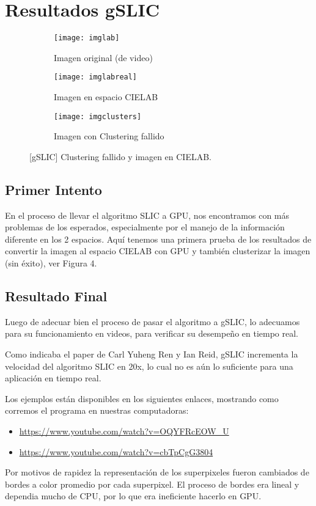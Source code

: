 \documentclass[11pt, oneside]{article}   	%
\begin{document}
\section{Resultados gSLIC}

\begin{figure}
\label{fig4}
\centering
\begin{subfigure}[b]{0.3\textwidth}
\label{la1}
\caption{Imagen original (de video)}
\texttt{[image: imglab]}
\end{subfigure}
\begin{subfigure}[b]{0.3\textwidth}
\label{la2}
\caption{Imagen en espacio CIELAB}
\texttt{[image: imglabreal]}
\end{subfigure}
\begin{subfigure}[b]{0.3\textwidth}
\label{la3}
\caption{Imagen con Clustering fallido}
\texttt{[image: imgclusters]}
\end{subfigure}

\caption{[gSLIC] Clustering fallido y imagen en CIELAB.}
\end{figure}

\subsection{Primer Intento}
En el proceso de llevar el algoritmo SLIC a GPU, nos encontramos con m\'as problemas de los esperados, especialmente por el manejo de la informaci\'on diferente en los 2 espacios. Aqu\'i tenemos una primera prueba de los resultados de convertir la imagen al espacio CIELAB con GPU y tambi\'en clusterizar la imagen (sin \'exito), ver Figura 4.

\subsection{Resultado Final}
Luego de adecuar bien el proceso de pasar el algoritmo a gSLIC, lo adecuamos para su funcionamiento en videos, para verificar su desempe\~no en tiempo real.

Como indicaba el paper de Carl Yuheng Ren y Ian Reid\cite{YHRen_gSLIC}, gSLIC incrementa la velocidad del algoritmo SLIC en 20x, lo cual no es a\'un lo suficiente para una aplicaci\'on en tiempo real.

Los ejemplos est\'an disponibles en los siguientes enlaces, mostrando como corremos el programa en nuestras computadoras:

\begin{itemize}
\item \url{https://www.youtube.com/watch?v=OQYFRcEOW_U}
\item \url{https://www.youtube.com/watch?v=cbTpCgG3804}
\end{itemize}

Por motivos de rapidez la representaci\'on de los superpixeles fueron cambiados de bordes a color promedio por cada superpixel. El proceso de bordes era lineal y dependia mucho de CPU, por lo que era ineficiente hacerlo en GPU.


{}

\end{document}
